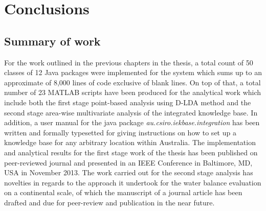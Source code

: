 
\chapter{Conclusions} %

\label{ch:conclusion} %

\section{Summary of work}
For the work outlined in the previous chapters in the thesis, a total count of 50 classes of 12 Java packages were implemented for the system which sums up to an approximate of 8,000 lines of code exclusive of blank lines. On top of that, a total number of 23 MATLAB scripts have been produced for the analytical work which include both the first stage point-based analysis using D-LDA method and the second stage area-wise multivariate analysis of the integrated knowledge base. In addition, a user manual for the java package \emph{au.csiro.iekbase.integration} has been written and formally typesetted for giving instructions on how to set up a knowledge base for any arbitrary location within Australia. The implementation and analytical results for the first stage work of the thesis has been published on peer-reviewed journal and presented in an IEEE Conference in Baltimore, MD, USA in November 2013\citep{Li2013}. The work carried out for the second stage analysis has novelties in regards to the approach it undertook for the water balance evaluation on a continental scale, of which the manuscript of a journal article has been drafted and due for peer-review and publication in the near future.
